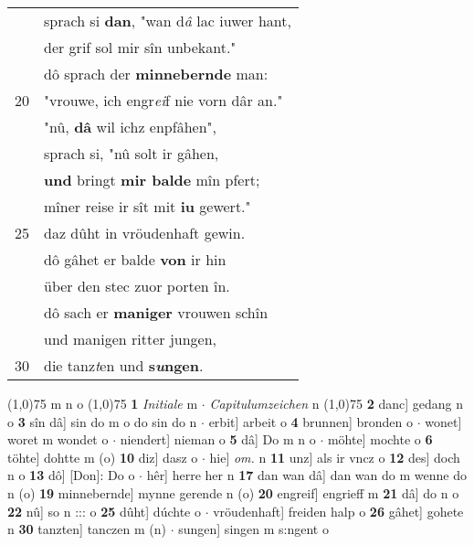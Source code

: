 \documentclass[8pt,a4paper,notitlepage]{article}
\begin{document}
\begin{table}[ht]
\begin{minipage}[t]{0.5\linewidth}
\begin{tabular}{rl}
 & sprach si \textbf{dan}, "wan d\textit{â} lac iuwer hant,\\ 
 & der grif sol mir sîn unbekant."\\ 
 & dô sprach der \textbf{minnebernde} man:\\ 
20 & "vrouwe, ich engr\textit{ei}f nie vorn dâr an."\\ 
 & "nû, \textbf{dâ} wil ichz enpfâhen",\\ 
 & sprach si, "nû solt ir gâhen,\\ 
 & \textbf{und} bringt \textbf{mir balde} mîn pfert;\\ 
 & mîner reise ir sît mit \textbf{iu} gewert."\\ 
25 & daz dûht in vröudenhaft gewin.\\ 
 & dô gâhet er balde \textbf{von} ir hin\\ 
 & über den stec zuor porten în.\\ 
 & dô sach er \textbf{maniger} vrouwen schîn\\ 
 & und manigen ritter jungen,\\ 
30 & die tanz\textit{t}en und \textbf{s\textit{u}ngen}.\\ 
\end{tabular}
\scriptsize
\line(1,0){75} \newline
m n o \newline
\line(1,0){75} \newline
\textbf{1} \textit{Initiale} m   $\cdot$ \textit{Capitulumzeichen} n  \newline
\line(1,0){75} \newline
\textbf{2} danc] gedang n o \textbf{3} sîn dâ] sin do m o do sin do n  $\cdot$ erbit] arbeit o \textbf{4} brunnen] bronden o  $\cdot$ wonet] woret m wondet o  $\cdot$ niendert] nieman o \textbf{5} dâ] Do m n o  $\cdot$ möhte] mochte o \textbf{6} töhte] dohtte m (o) \textbf{10} diz] dasz o  $\cdot$ hie] \textit{om.} n \textbf{11} unz] als ir vncz o \textbf{12} des] doch n o \textbf{13} dô] [Don]: Do o  $\cdot$ hêr] herre her n \textbf{17} dan wan dâ] dan wan do m wenne do n (o) \textbf{19} minnebernde] mynne gerende n (o) \textbf{20} engreif] engrieff m \textbf{21} dâ] do n o \textbf{22} nû] so n ::: o \textbf{25} dûht] dúchte o  $\cdot$ vröudenhaft] freiden halp o \textbf{26} gâhet] gohete n \textbf{30} tanzten] tanczen m (n)  $\cdot$ sungen] singen m s:ngent o \newline
\end{minipage}
\end{table}
\newpage
\end{document}
